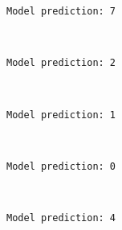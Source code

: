 \documentclass[11pt]{article}
\begin{document}
    \begin{Verbatim}[commandchars=\\\{\}]
Model prediction: 7

    \end{Verbatim}

    \begin{center}
    \end{center}
    { \hspace*{\fill} \\}
    
    \begin{Verbatim}[commandchars=\\\{\}]
Model prediction: 2

    \end{Verbatim}

    \begin{center}
    \end{center}
    { \hspace*{\fill} \\}
    
    \begin{Verbatim}[commandchars=\\\{\}]
Model prediction: 1

    \end{Verbatim}

    \begin{center}
    \end{center}
    { \hspace*{\fill} \\}
    
    \begin{Verbatim}[commandchars=\\\{\}]
Model prediction: 0

    \end{Verbatim}

    \begin{center}
    \end{center}
    { \hspace*{\fill} \\}
    
    \begin{Verbatim}[commandchars=\\\{\}]
Model prediction: 4

    \end{Verbatim}


    
    
    
    
\end{document}
